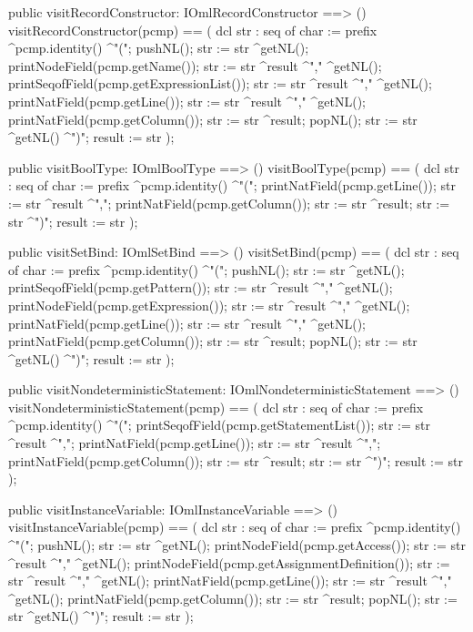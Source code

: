\begin{vdm_al}
  public visitRecordConstructor: IOmlRecordConstructor ==> ()
  visitRecordConstructor(pcmp) ==
    ( dcl str : seq of char := prefix ^pcmp.identity() ^"(";
      pushNL();
      str := str ^getNL();
      printNodeField(pcmp.getName());
      str := str ^result ^"," ^getNL();
      printSeqofField(pcmp.getExpressionList());
      str := str ^result ^"," ^getNL();
      printNatField(pcmp.getLine());
      str := str ^result ^"," ^getNL();
      printNatField(pcmp.getColumn());
      str := str ^result;
      popNL();
      str := str ^getNL() ^")";
      result := str );

  public visitBoolType: IOmlBoolType ==> ()
  visitBoolType(pcmp) ==
    ( dcl str : seq of char := prefix ^pcmp.identity() ^"(";
      printNatField(pcmp.getLine());
      str := str ^result ^",";
      printNatField(pcmp.getColumn());
      str := str ^result;
      str := str ^")";
      result := str );

  public visitSetBind: IOmlSetBind ==> ()
  visitSetBind(pcmp) ==
    ( dcl str : seq of char := prefix ^pcmp.identity() ^"(";
      pushNL();
      str := str ^getNL();
      printSeqofField(pcmp.getPattern());
      str := str ^result ^"," ^getNL();
      printNodeField(pcmp.getExpression());
      str := str ^result ^"," ^getNL();
      printNatField(pcmp.getLine());
      str := str ^result ^"," ^getNL();
      printNatField(pcmp.getColumn());
      str := str ^result;
      popNL();
      str := str ^getNL() ^")";
      result := str );

  public visitNondeterministicStatement: IOmlNondeterministicStatement ==> ()
  visitNondeterministicStatement(pcmp) ==
    ( dcl str : seq of char := prefix ^pcmp.identity() ^"(";
      printSeqofField(pcmp.getStatementList());
      str := str ^result ^",";
      printNatField(pcmp.getLine());
      str := str ^result ^",";
      printNatField(pcmp.getColumn());
      str := str ^result;
      str := str ^")";
      result := str );

  public visitInstanceVariable: IOmlInstanceVariable ==> ()
  visitInstanceVariable(pcmp) ==
    ( dcl str : seq of char := prefix ^pcmp.identity() ^"(";
      pushNL();
      str := str ^getNL();
      printNodeField(pcmp.getAccess());
      str := str ^result ^"," ^getNL();
      printNodeField(pcmp.getAssignmentDefinition());
      str := str ^result ^"," ^getNL();
      printNatField(pcmp.getLine());
      str := str ^result ^"," ^getNL();
      printNatField(pcmp.getColumn());
      str := str ^result;
      popNL();
      str := str ^getNL() ^")";
      result := str );


\end{vdm_al}

